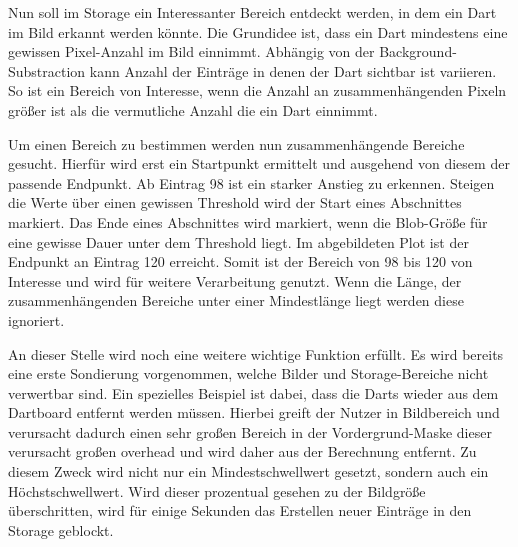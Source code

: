 Nun soll im Storage ein Interessanter Bereich entdeckt werden, in dem ein Dart im Bild erkannt werden könnte. Die Grundidee ist, dass ein Dart mindestens eine gewissen Pixel-Anzahl im Bild einnimmt. Abhängig von der Background-Substraction kann Anzahl der Einträge in denen der Dart sichtbar ist variieren. So ist ein Bereich von Interesse, wenn die Anzahl an zusammenhängenden Pixeln größer ist als die vermutliche Anzahl die ein Dart einnimmt.

Um einen Bereich zu bestimmen werden nun zusammenhängende Bereiche gesucht. Hierfür wird erst ein Startpunkt ermittelt und ausgehend von diesem der passende Endpunkt.
Ab Eintrag 98 ist ein starker Anstieg zu erkennen. Steigen die Werte über einen gewissen Threshold wird der Start eines Abschnittes markiert. Das Ende eines Abschnittes wird markiert, wenn die Blob-Größe für eine gewisse Dauer unter dem Threshold liegt. Im abgebildeten Plot ist der Endpunkt an Eintrag 120 erreicht. Somit ist der Bereich von 98 bis 120 von Interesse und wird für weitere Verarbeitung genutzt. 
Wenn die Länge, der zusammenhängenden Bereiche unter einer Mindestlänge liegt werden diese ignoriert.

An dieser Stelle wird noch eine weitere wichtige Funktion erfüllt. Es wird bereits eine erste Sondierung vorgenommen, welche Bilder und Storage-Bereiche nicht verwertbar sind. 
Ein spezielles Beispiel ist dabei, dass die Darts wieder aus dem Dartboard entfernt werden müssen. Hierbei greift der Nutzer in Bildbereich und verursacht dadurch einen sehr großen Bereich in der Vordergrund-Maske dieser verursacht großen overhead und wird daher aus der Berechnung entfernt. Zu diesem Zweck wird nicht nur ein Mindestschwellwert gesetzt, sondern auch ein Höchstschwellwert. Wird dieser prozentual gesehen zu der Bildgröße überschritten, wird für einige Sekunden das Erstellen neuer Einträge in den Storage geblockt.

